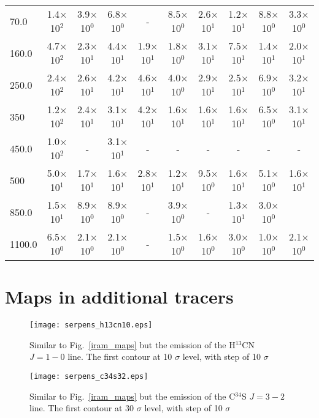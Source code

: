 \documentclass{aa}
\begin{document}
\begin{appendix}
\begin{table*}
\begin{tabular}{l c c c c c c c c c}
70.0 & 1.4$\times$10$^{2}$ & 3.9$\times$10$^{0}$ & 6.8$\times$10$^{0}$ & - & 8.5$\times$10$^{0}$ & 2.6$\times$10$^{1}$ & 1.2$\times$10$^{1}$ & 8.8$\times$10$^{0}$ & 3.3$\times$10$^{0}$\\
160.0 & 4.7$\times$10$^{2}$ & 2.3$\times$10$^{1}$ & 4.4$\times$10$^{1}$ & 1.9$\times$10$^{1}$ & 1.8$\times$10$^{0}$ & 3.1$\times$10$^{1}$ & 7.5$\times$10$^{1}$ & 1.4$\times$10$^{1}$ & 2.0$\times$10$^{1}$\\
250.0 &  2.4$\times$10$^{2}$ & 2.6$\times$10$^{1}$ & 4.2$\times$10$^{1}$ & 4.6$\times$10$^{1}$ & 4.0$\times$10$^{0}$ & 2.9$\times$10$^{1}$ & 2.5$\times$10$^{1}$ & 6.9$\times$10$^{0}$ & 3.2$\times$10$^{1}$\\
350 & 1.2$\times$10$^{2}$ & 2.4$\times$10$^{1}$ & 3.1$\times$10$^{1}$ & 4.2$\times$10$^{1}$ & 1.6$\times$10$^{1}$ & 1.6$\times$10$^{1}$ & 1.6$\times$10$^{1}$ & 6.5$\times$10$^{0}$ & 3.1$\times$10$^{1}$\\
450.0 & 1.0$\times$10$^{2}$ &-  & 3.1$\times$10$^{1}$ &- &- &- &- &- &-\\
500 & 5.0$\times$10$^{1}$ & 1.7$\times$10$^{1}$ & 1.6$\times$10$^{1}$ & 2.8$\times$10$^{1}$ & 1.2$\times$10$^{1}$ & 9.5$\times$10$^{0}$ & 1.6$\times$10$^{1}$ & 5.1$\times$10$^{0}$ & 1.6$\times$10$^{1}$\\
850.0 & 1.5$\times$10$^{1}$ & 8.9$\times$10$^{0}$ & 8.9$\times$10$^{0}$ & - & 3.9$\times$10$^{0}$ & - & 1.3$\times$10$^{1}$ & 3.0$\times$10$^{0}$ &\\
1100.0 & 6.5$\times$10$^{0}$ & 2.1$\times$10$^{0}$ & 2.1$\times$10$^{0}$ & - & 1.5$\times$10$^{0}$ & 1.6$\times$10$^{0}$ & 3.0$\times$10$^{0}$ & 1.0$\times$10$^{0}$ & 2.1$\times$10$^{0}$\\
\hline \end{tabular} 
\end{table*}

\section{Maps in additional tracers}

\begin{figure} \texttt{[image: serpens\_h13cn10.eps]} \caption{Similar to Fig.~\ref{iram_maps}
but the emission of the H$^{13}$CN $J=1-0$ line. The first contour at 10 $\sigma$ level, with step
of 10 $\sigma$} \label{h13cn10} \end{figure}


\begin{figure} \texttt{[image: serpens\_c34s32.eps]} \caption{Similar to Fig.~\ref{iram_maps}
but the emission of the C$^{34}$S $J=3-2$ line. The first contour at 30 $\sigma$ level, with step of
10 $\sigma$} \label{c34s32} \end{figure}


\end{appendix}
\end{document}
